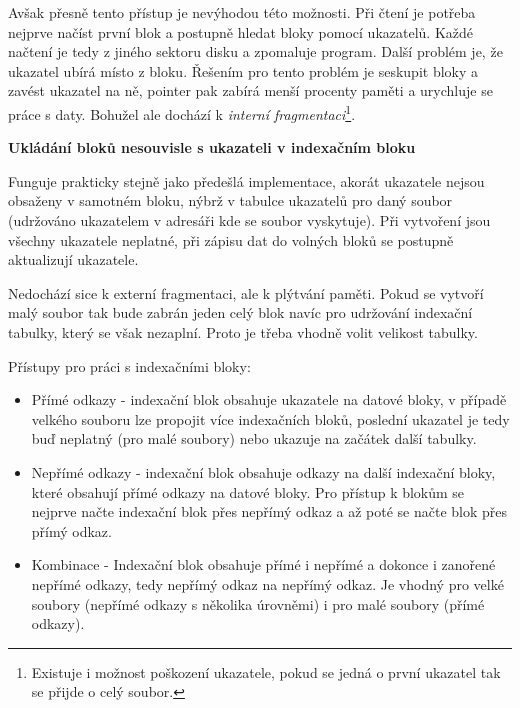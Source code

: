 \vspace{0,5cm}

Avšak přesně tento přístup je nevýhodou této možnosti. Při čtení je potřeba nejprve načíst první blok a postupně hledat bloky pomocí ukazatelů. Každé načtení je tedy z jiného sektoru disku a zpomaluje program. Další problém je, že ukazatel ubírá místo z bloku. Řešením pro tento problém je seskupit bloky a zavést ukazatel na ně, pointer pak zabírá menší procenty paměti a urychluje se práce s daty. Bohužel ale dochází k \textit{interní fragmentaci}\footnote{Existuje i možnost poškození ukazatele, pokud se jedná o první ukazatel tak se přijde o celý soubor.}.

\begin{large}
    \vspace{0,5cm}
    \textbf{Ukládání bloků nesouvisle s ukazateli v indexačním bloku}
\end{large}

Funguje prakticky stejně jako předešlá implementace, akorát ukazatele nejsou obsaženy v samotném bloku, nýbrž v tabulce ukazatelů pro daný soubor (udržováno ukazatelem v adresáři kde se soubor vyskytuje). Při vytvoření jsou všechny ukazatele neplatné, při zápisu dat do volných bloků se postupně aktualizují ukazatele. 

\vspace{0,5cm}

Nedochází sice k externí fragmentaci, ale k plýtvání paměti. Pokud se vytvoří malý soubor tak bude zabrán jeden celý blok navíc pro udržování indexační tabulky, který se však nezaplní. Proto je třeba vhodně volit velikost tabulky.

\vspace{0,5cm}

Přístupy pro práci s indexačními bloky:
\begin{itemize}
    \item Přímé odkazy - indexační blok obsahuje ukazatele na datové bloky, v případě velkého souboru lze propojit více indexačních bloků, poslední ukazatel je tedy buď neplatný (pro malé soubory) nebo ukazuje na začátek další tabulky.
    \item Nepřímé odkazy - indexační blok obsahuje odkazy na další indexační bloky, které obsahují přímé odkazy na datové bloky. Pro přístup k blokům se nejprve načte indexační blok přes nepřímý odkaz a až poté se načte blok přes přímý odkaz. 
    \item Kombinace - Indexační blok obsahuje přímé i nepřímé a dokonce i zanořené nepřímé odkazy, tedy nepřímý odkaz na nepřímý odkaz. Je vhodný pro velké soubory (nepřímé odkazy s několika úrovněmi) i pro malé soubory (přímé odkazy).
\end{itemize}

